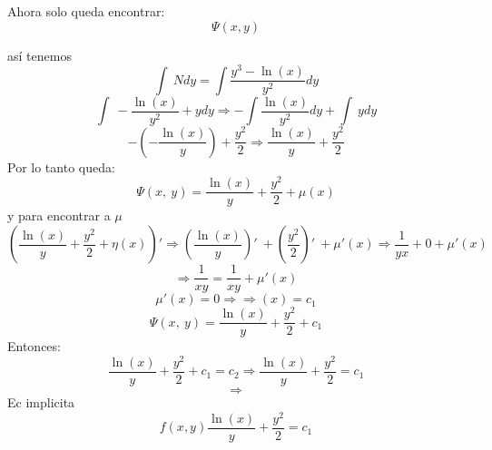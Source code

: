 Ahora solo queda encontrar: $$\Psi(x,y)$$

así tenemos $$\int \:Ndy=\int \frac{y^3-\ln \left(x\right)}{y^2}dy$$
$$\int \:-\frac{\ln \left(x\right)}{y^2}+ydy\Rightarrow -\int \frac{\ln \left(x\right)}{y^2}dy+\int \:ydy$$
$$-\left(-\frac{\ln \left(x\right)}{y}\right)+\frac{y^2}{2}\Rightarrow \frac{\ln \left(x\right)}{y}+\frac{y^2}{2}$$
Por lo tanto queda:
$$\Psi\left(x,\:y\right)=\frac{\ln \left(x\right)}{y}+\frac{y^2}{2}+\mu\left(x\right)$$
y para encontrar a $\mu$
$$\left(\frac{\ln \left(x\right)}{y}+\frac{y^2}{2}+η\left(x\right)\right)'\Rightarrow \left(\frac{\ln \left(x\right)}{y}\right)'\:+\left(\frac{y^2}{2}\right)'\:+\mu'\left(x\right)\Rightarrow \frac{1}{yx}+0+\mu'\left(x\right)$$
$$\Rightarrow \frac{1}{xy}=\frac{1}{xy}+\mu'\left(x\right)$$
$$\mu'\left(x\right)=0 \Rightarrow \Rightarrow\left(x\right)=c_1$$
$$\Psi \left(x,\:y\right)=\frac{\ln \left(x\right)}{y}+\frac{y^2}{2}+c_1$$
Entonces:
$$\frac{\ln \left(x\right)}{y}+\frac{y^2}{2}+c_1=c_2\Rightarrow \frac{\ln \left(x\right)}{y}+\frac{y^2}{2}=c_1$$
$$\Rightarrow$$
Ec implicita
$$f(x,y)\frac{\ln \left(x\right)}{y}+\frac{y^2}{2}=c_1$$
